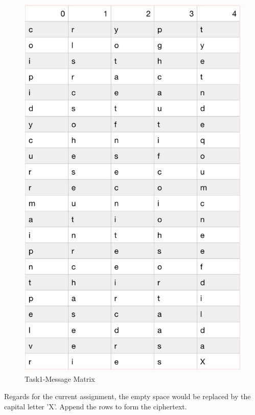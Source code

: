 \documentclass[twoside,twocolumn]{article}
\begin{document}
\begin{figure}[H]
  \centering
  \includegraphics[scale=0.45]{./Graphs/Figure1.2.png}
  \caption{Task1-Message Matrix}
  \label{fig:testfig1}
\end{figure}
Regards for the current assignment, the empty space would be replaced by the capital letter 'X'.  Append the rows to form the ciphertext.
\end{document}
